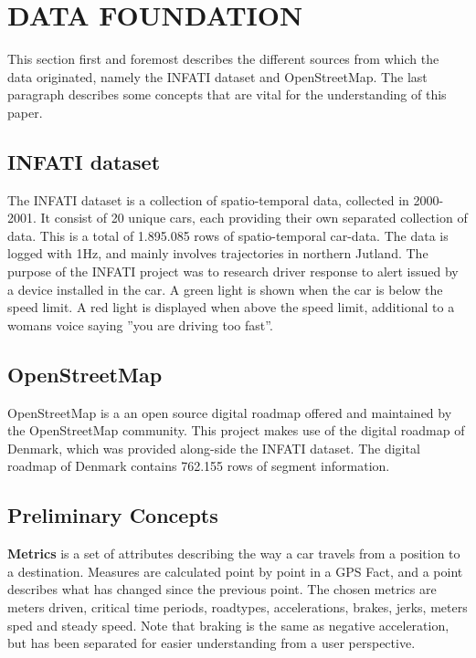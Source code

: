 \section{DATA FOUNDATION}\label{sec:datafound}

This section first and foremost describes the different sources from which the data originated, namely the INFATI dataset and OpenStreetMap. The last paragraph describes some concepts that are vital for the understanding of this paper. 

\subsection{INFATI dataset}
The INFATI dataset\cite{art:INFATI} is a collection of spatio-temporal data, collected in 2000-2001. It consist of 20 unique cars, each providing their own separated collection of data. This is a total of 1.895.085 rows of spatio-temporal car-data. The data is logged with 1Hz, and mainly involves trajectories in northern Jutland. The purpose of the INFATI\cite{art:INFATI} project was to research driver response to alert issued by a device installed in the car. A green light is shown when the car is below the speed limit. A red light is displayed when above the speed limit, additional to a womans voice saying ''you are driving too fast''.

\subsection{OpenStreetMap}
OpenStreetMap\cite{osm} is a an open source digital roadmap offered  and maintained by the OpenStreetMap community. This project makes use of the digital roadmap of Denmark, which was provided along-side the INFATI dataset\cite{art:INFATI}. The digital roadmap of Denmark contains 762.155 rows of segment information.

\subsection{Preliminary Concepts}\label{subsec:precon}
\textbf{Metrics} is a set of attributes describing the way a car travels from a position  to a destination. Measures are calculated point by point in a GPS Fact, and a point describes what has changed since the previous point. The chosen metrics are meters driven, critical time periods, roadtypes, accelerations, brakes, jerks, meters sped and steady speed. Note that braking is the same as negative acceleration, but has been separated for easier understanding from a user perspective.

